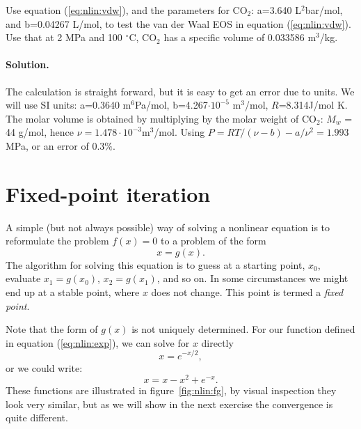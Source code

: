 \documentclass[graybox,sectrefs,envcountresetchap,open=right,final]{svmonodo}
\makeatletter
\newenvironment{doconceexercise}{}{}
\newcounter{doconceexercisecounter}%
\newcommand\listofexercises{
\chapter*{List of Exercises
          \@mkboth{List of Exercises}{List of Exercises}}
\markboth{List of Exercises}{List of Exercises}
\@starttoc{loe}
}
\makeatother
\begin{document}
\begin{doconceexercise}

                             

Use equation (\ref{eq:nlin:vdw}), and the parameters for CO$_2$: a=3.640 L$^2$bar/mol, and b=0.04267 L/mol, to test the van der Waal EOS in equation (\ref{eq:nlin:vdw}). Use that at 2 MPa and 100 $^\circ$C, CO$_2$ has a specific volume of 0.033586 m$^3$/kg.

\paragraph{Solution.}
The calculation is straight forward, but it is easy to get an error due to units. We will use SI units: a=0.3640 m$^6$Pa/mol, b=4.267$\cdot10^{-5}$ m$^3$/mol, $R$=8.314J/mol K.  The molar volume is obtained by multiplying by the molar weight of CO$_2$: $M_w$ = 44 g/mol, hence $\nu=1.478\cdot10^{-3}$m$^3$/mol. Using $P=RT/(\nu-b)-a/\nu^2=1.993$ MPa, or an error of $0.3\%$.


\end{doconceexercise}

\section{Fixed-point iteration}
A simple (but not always possible) way of solving a nonlinear equation is to reformulate the problem $f(x)=0$ to a problem of the form
\begin{equation}
x=g(x).
\label{eq:nlin:g}
\end{equation}
The algorithm for solving this equation is to guess at a starting point, $x_0$, evaluate $x_1=g(x_0)$, $x_2=g(x_1)$, and so on. In some circumstances we might end up at a stable point, where $x$ does not change. This point is termed a \emph{fixed point}.

Note that the form of $g(x)$ is not uniquely determined. For our function defined in equation (\ref{eq:nlin:exp}), we can solve for $x$ directly
\begin{equation}
x=e^{-x/2},
\label{eq:nlin:g2}
\end{equation}
or we could write:
\begin{equation}
x=x-x^2+e^{-x}.
\label{eq:nlin:g3}
\end{equation}
These functions are illustrated in figure~\ref{fig:nlin:fg}, by visual inspection they look very similar, but as we will show in the next exercise the convergence is quite different. 
\end{document}
